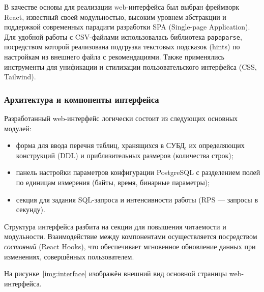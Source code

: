 В качестве основы для реализации web-интерфейса был выбран фреймворк React, известный своей модульностью, высоким уровнем абстракции и поддержкой современных парадигм разработки SPA (Single-page Application). Для удобной работы с CSV-файлами использовалась библиотека \texttt{papaparse}, посредством которой реализована подгрузка текстовых подсказок (hints) по настройкам из внешнего файла с рекомендациями. Также применялись инструменты для унификации и стилизации пользовательского интерфейса (CSS, Tailwind).

\subsubsection{Архитектура и компоненты интерфейса}

Разработанный web-интерфейс логически состоит из следующих основных модулей:
\begin{itemize}
    \item форма для ввода перечня таблиц, хранящихся в СУБД, их определяющих конструкций (DDL) и приблизительных размеров (количества строк);
    \item панель настройки параметров конфигурации PostgreSQL с разделением полей по единицам измерения (байты, время, бинарные параметры);
    \item секция для задания SQL-запроса и интенсивности работы (RPS --- запросы в секунду).
\end{itemize}

Структура интерфейса разбита на секции для повышения читаемости и модульности. Взаимодействие между компонентами осуществляется посредством \emph{состояний} (React Hooks), что обеспечивает мгновенное обновление данных при изменениях, совершённых пользователем.

На рисунке~\ref{img:interface} изображён внешний вид основной страницы web-интерфейса.

